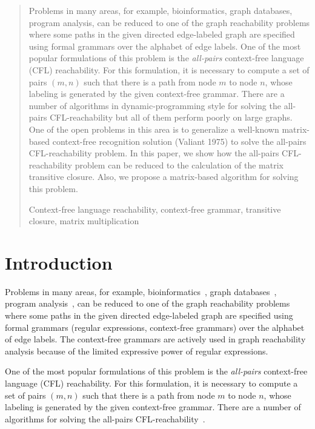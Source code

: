 \documentclass[runningheads,a4paper]{llncs}
\newcommand{\keywords}[1]{\par\addvspace\baselineskip
\noindent\keywordname\enspace\ignorespaces#1}
\begin{document}
\begin{abstract}
	Problems in many areas, for example, bioinformatics, graph databases, program analysis, can be reduced to one of the graph reachability problems where some paths in the given directed edge-labeled graph are specified using formal grammars over the alphabet of edge labels. One of the most popular formulations of this problem is the \textit{all-pairs} context-free language (CFL) reachability. For this formulation, it is necessary to compute a set of pairs $(m, n)$ such that there is a path from node $m$ to node $n$, whose labeling is generated by the given context-free grammar. There are a number of algorithms in dynamic-programming style for solving the all-pairs CFL-reachability but all of them perform poorly on large graphs. One of the open problems in this area is to generalize a well-known matrix-based context-free recognition solution (Valiant 1975) to solve the all-pairs CFL-reachability problem. In this paper, we show how the all-pairs CFL-reachability problem can be reduced to the calculation of the matrix transitive closure. Also, we propose a matrix-based algorithm for solving this problem.

\keywords{Context-free language reachability, context-free grammar, transitive closure, matrix multiplication}
\end{abstract}


\section{Introduction}%
Problems in many areas, for example, bioinformatics~\cite{Bio}, graph databases~\cite{graphDB}, program analysis~\cite{zhang2017context}, can be reduced to one of the graph reachability problems where some paths in the given directed edge-labeled graph are specified using formal grammars (regular expressions, context-free grammars) over the alphabet of edge labels. The context-free grammars are actively used in graph reachability analysis because of the limited expressive power of regular expressions.

One of the most popular formulations of this problem is the \textit{all-pairs} context-free language (CFL) reachability. For this formulation, it is necessary to compute a set of pairs $(m, n)$ such that there is a path from node $m$ to node $n$, whose labeling is generated by the given context-free grammar. There are a number of algorithms for solving the all-pairs CFL-reachability~\cite{GLL,hellingsRelational,RDF,GraphQueryWithEarley}.
\end{document}
